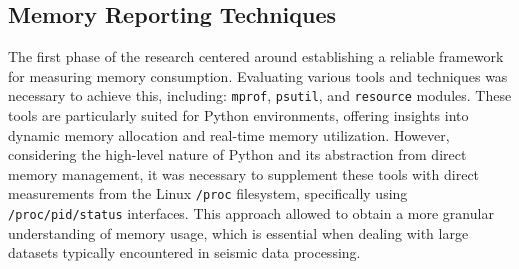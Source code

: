 \subsection{Memory Reporting Techniques}

The first phase of the research centered around establishing a reliable framework for measuring memory consumption.
Evaluating various tools and techniques was necessary to achieve this, including: \texttt{mprof}, \texttt{psutil}, and \texttt{resource} modules.
These tools are particularly suited for Python environments, offering insights into dynamic memory allocation and real-time memory utilization.
However, considering the high-level nature of Python and its abstraction from direct memory management, it was necessary to supplement these tools with direct measurements from the Linux \texttt{/proc} filesystem, specifically using \texttt{/proc/pid/status} interfaces.
This approach allowed to obtain a more granular understanding of memory usage, which is essential when dealing with large datasets typically encountered in seismic data processing.